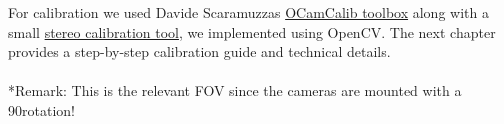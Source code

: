 For calibration we used Davide Scaramuzzas
\href{https://sites.google.com/site/scarabotix/ocamcalib-toolbox}{OCamCalib toolbox}\cite{ocamcalib} along with a small
\href{https://github.com/ands/OculusMeetsAR/tree/master/Hardware}{stereo calibration tool}, we implemented using OpenCV.
The next chapter provides a step-by-step calibration guide and technical details.
\\
\\
*Remark: This is the relevant FOV since the cameras are mounted with a 90\textdegree rotation!